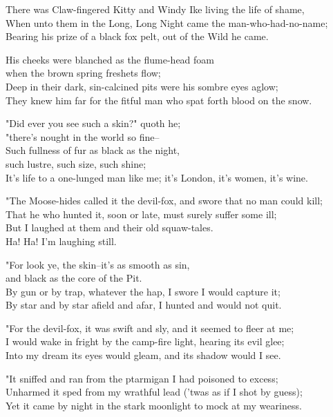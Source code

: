 
\begin{poemblock}
There was Claw-fingered Kitty and Windy Ike living the life of shame,\\
When unto them in the Long, Long Night came the man-who-had-no-name;\\
Bearing his prize of a black fox pelt, out of the Wild he came.

His cheeks were blanched as the flume-head foam\\
\idt when the brown spring freshets flow;\\
Deep in their dark, sin-calcined pits were his sombre eyes aglow;\\
They knew him far for the fitful man who spat forth blood on the snow.

"Did ever you see such a skin?" quoth he;\\
\idt "there's nought in the world so fine--\\
Such fullness of fur as black as the night,\\
\idt such lustre, such size, such shine;\\
It's life to a one-lunged man like me; it's London, it's women, it's wine.

"The Moose-hides called it the devil-fox, and swore that no man could kill;\\
That he who hunted it, soon or late, must surely suffer some ill;\\
But I laughed at them and their old squaw-tales.\\
\idt Ha!  Ha!  I'm laughing still.

"For look ye, the skin--it's as smooth as sin,\\
\idt and black as the core of the Pit.\\
By gun or by trap, whatever the hap, I swore I would capture it;\\
By star and by star afield and afar, I hunted and would not quit.

"For the devil-fox, it was swift and sly, and it seemed to fleer at me;\\
I would wake in fright by the camp-fire light, hearing its evil glee;\\
Into my dream its eyes would gleam, and its shadow would I see.

"It sniffed and ran from the ptarmigan I had poisoned to excess;\\
Unharmed it sped from my wrathful lead ('twas as if I shot by guess);\\
Yet it came by night in the stark moonlight to mock at my weariness.


\end{poemblock}
